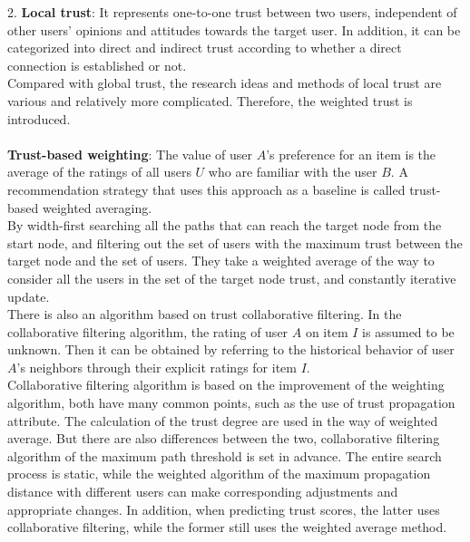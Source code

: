 2.
\textbf{Local trust}:
It represents one-to-one trust between two users, independent of other users' opinions 
and attitudes towards the target user. In addition, it can be categorized into direct and indirect 
trust according to whether a direct connection is established or not\cite{b15}.
\\
Compared with global trust, the research ideas and methods of local trust are various and 
relatively more complicated. Therefore, the weighted trust is introduced.
\\
\\
\textbf{Trust-based weighting}:
The value of user $A$'s preference for an item is the average of the ratings of 
all users $U$ who are familiar with the user $B$. A recommendation strategy that 
uses this approach as a baseline is called trust-based weighted averaging\cite{b15}.
\\
By width-first searching all the paths that can reach the target node from the start node, 
and filtering out the set of users with the maximum trust between the target node and 
the set of users. They take a weighted average of the way to consider all the users in the 
set of the target node trust, and constantly iterative update\cite{b27}.
\\
There is also an algorithm based on trust collaborative filtering. In the collaborative 
filtering algorithm, the rating of user $A$ on item $I$ is assumed to be unknown. Then it 
can be obtained by referring to the historical behavior of user $A$'s neighbors through 
their explicit ratings for item $I$\cite{b29}.
\\
Collaborative filtering algorithm is based on the improvement of the weighting algorithm, 
both have many common points, such as the use of trust propagation attribute. The 
calculation of the trust degree are used in the way of weighted average\cite{b15}. But there are 
also differences between the two, collaborative filtering algorithm of the maximum path 
threshold is set in advance. The entire search process is static, while the weighted 
algorithm of the maximum propagation distance with different users can make corresponding 
adjustments and appropriate changes. In addition, when predicting trust scores, the latter 
uses collaborative filtering, while the former still uses the weighted average method\cite{b27}.

